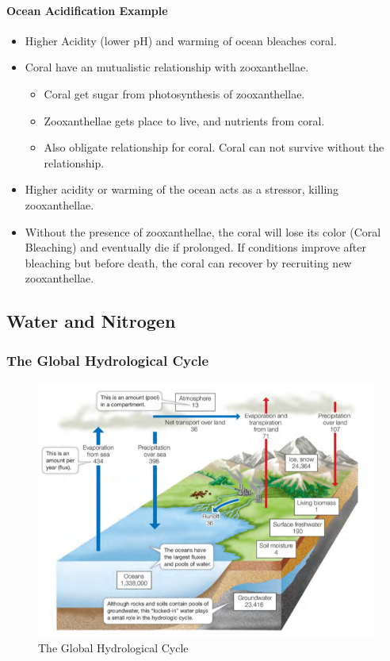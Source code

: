 \documentclass[12pt]{article}
\begin{document}
\paragraph{Ocean Acidification Example}
\begin{itemize}
    \item Higher Acidity (lower pH) and warming of ocean bleaches coral.
    \item Coral have an mutualistic relationship with zooxanthellae.
          \begin{itemize}
              \item Coral get sugar from photosynthesis of zooxanthellae.
              \item Zooxanthellae gets place to live, and nutrients from coral.
              \item Also obligate relationship for coral. Coral can not survive without the relationship.
          \end{itemize}
    \item Higher acidity or warming of the ocean acts as a stressor, killing zooxanthellae.
    \item Without the presence of zooxanthellae, the coral will lose its color (Coral Bleaching) and eventually die if prolonged. If conditions improve after bleaching but before death, the coral can recover by recruiting new zooxanthellae.
\end{itemize}

\subsection{Water and Nitrogen}

\subsubsection{The Global Hydrological Cycle}

\begin{figure}[tph]
    \centering
    \includegraphics[width=5in]{global-hydrological-cycle.png}
    \caption{The Global Hydrological Cycle}
    \label{global-hydrological}
\end{figure}
\end{document}
